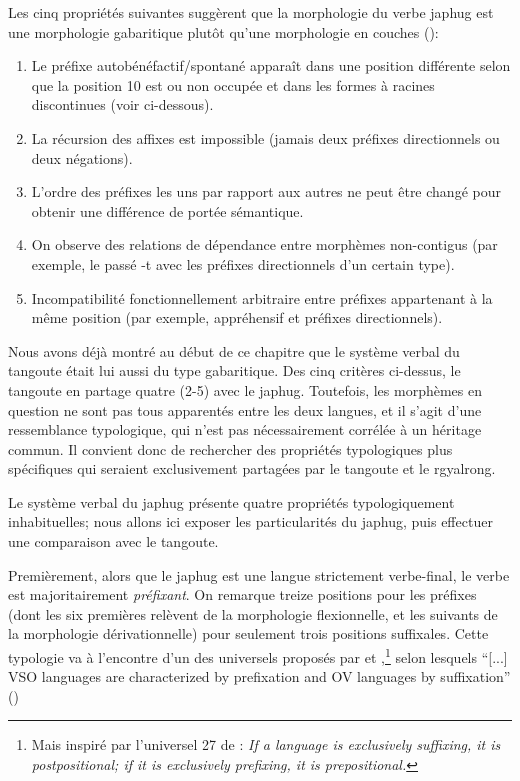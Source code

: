 \documentclass[oldfontcommands,twoside,a4paper,11pt,draft]{memoir}
\begin{document}
 Les cinq propriétés suivantes suggèrent que la morphologie du verbe japhug est une morphologie gabaritique plutôt qu'une morphologie en couches (\citealt{jacques13harmonization}):
 \begin{enumerate}
 
\item Le préfixe autobénéfactif/spontané  apparaît dans une position différente selon que la position 10 est ou non occupée et dans les formes à racines discontinues (voir ci-dessous).
\item La récursion des affixes est impossible (jamais deux préfixes directionnels ou deux négations).
\item L'ordre des préfixes les uns par rapport aux autres ne peut être changé pour obtenir une différence de portée sémantique.
\item On observe des relations de dépendance entre morphèmes non-contigus (par exemple, le passé -t avec les préfixes directionnels d'un certain type).
\item Incompatibilité fonctionnellement arbitraire entre préfixes appartenant à la même position (par exemple, appréhensif et préfixes directionnels).
\end{enumerate}

Nous avons déjà montré au début de ce chapitre que le système verbal du tangoute était lui aussi du type gabaritique. Des cinq critères ci-dessus, le tangoute en partage quatre (2-5) avec le japhug. Toutefois, les morphèmes en question ne sont pas tous apparentés entre les deux langues, et il s'agit d'une ressemblance typologique, qui n'est pas nécessairement corrélée à un héritage commun. Il convient donc de rechercher des propriétés typologiques plus spécifiques qui seraient exclusivement partagées par le tangoute et le rgyalrong. 

Le système verbal du japhug présente quatre propriétés typologiquement inhabituelles; nous allons ici exposer les particularités du japhug, puis effectuer une comparaison avec le tangoute.

Premièrement, alors que le japhug est une langue strictement verbe-final, le verbe est majoritairement \textit{préfixant}. On remarque treize positions pour les préfixes (dont les six premières relèvent de la morphologie flexionnelle, et les suivants de la morphologie dérivationnelle) pour seulement trois positions suffixales. Cette typologie va à l'encontre d'un des universels proposés par \citet{lehmann73structural} et  \citet{vennemann74analogy},\footnote{Mais inspiré par l'universel 27 de  \citet[93]{greenberg66}:  \textit{If a language is exclusively suffixing, it is postpositional; if it is exclusively
prefixing, it is prepositional.}   } selon lesquels  ``[...] VSO languages are characterized by prefixation and OV languages by suffixation'' (\citealt[23]{lehmann78typology})
\end{document}
